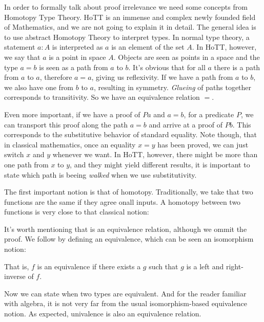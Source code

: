   In order to formally talk about proof irrelevance we need some concepts from Homotopy Type Theory\cite{hottbook}.
  HoTT is an immense and complex newly founded field of Mathematics, and we are not going to explain
  it in detail. The general idea is to use abstract Homotopy Theory to interpret types. In normal
  type theory, a statement $a : A$ is interpreted as $a$ is an element of the set $A$. In HoTT, however,
  we say that $a$ is a point in space $A$. Objects are seen as points in a space and the type $a = b$ is seen as a path from $a$ to $b$.
  It's obvious that for all $a$ there is a path from $a$ to $a$, therefore $a = a$, giving us reflexivity.
  If we have a path from $a$ to $b$, we also have one from $b$ to $a$, resulting in symmetry.
  \emph{Glueing} of paths together corresponds to transitivity. So we have an equivalence relation $=$.
  
  Even more important, if we have a proof of $P a$ and $a = b$, for a predicate $P$, we can
  transport this proof along the path $a = b$ and arrive at a proof of $P b$. This corresponds to
  the substitutive behavior of standard equality. Note though, that in classical mathematics,
  once an equality $x = y$ has been proved, we can just switch $x$ and $y$ whenever we want. 
  In HoTT, however, there might be more than one path from $x$ to $y$, and they might yield different
  results, it is important to state which path is beeing \emph{walked} when we use substitutivity.
  
  The first important notion is that of homotopy. Traditionally, we take that two functions are
  the same if they agree onall inputs. A homotopy between two functions is very close to that
  classical notion:
  
  
  It's worth mentioning that \F{\_\~{}\_} is an equivalence relation, although we ommit the proof.
  We follow by defining an equivalence, which can be seen an isomorphism notion:
  
  
  That is, $f$ is an equivalence if there exists a $g$ such that $g$ is a left and right-inverse
  of $f$.
  
  Now we can state when two types are equivalent. And for the reader familiar with algebra, it is
  not very far from the usual isomorphism-based equivalence notion. As expected, univalence is
  also an equivalence relation.
  
  
